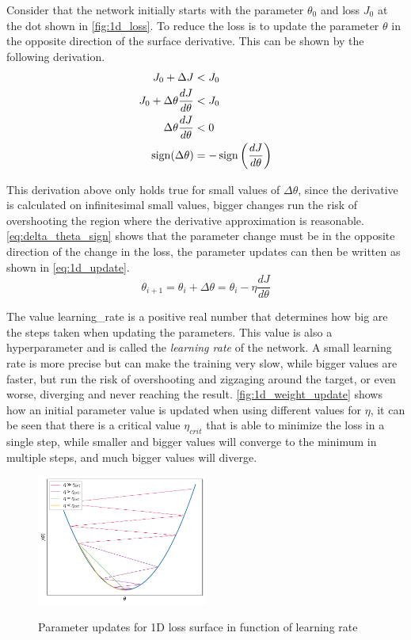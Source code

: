 Consider that the network initially starts with the parameter $\theta_0$ and loss $J_0$ at the dot shown in \autoref{fig:1d_loss}. To reduce the loss is to update the parameter $\theta$ in the opposite direction of the surface derivative. This can be shown by the following derivation.
\begin{align}
    J_0 + \Delta J & < J_0 \nonumber \\
    J_0 + \Delta\theta \frac{dJ}{d\theta} & < J_0 \nonumber \\
    \Delta\theta \frac{dJ}{d\theta} & < 0 \nonumber \\
    \operatorname{sign}(\Delta\theta) & = -\operatorname{sign}\left( \frac{dJ}{d\theta} \right) \label{eq:delta_theta_sign}
\end{align}

This derivation above only holds true for small values of $\Delta\theta$, since the derivative is calculated on infinitesimal small values, bigger changes run the risk of overshooting the region where the derivative approximation is reasonable.
\autoref{eq:delta_theta_sign} shows that the parameter change must be in the opposite direction of the change in the loss, the parameter updates can then be written as shown in \autoref{eq:1d_update}.
\begin{equation} \label{eq:1d_update}
    \theta_{i+1} = \theta_{i} + \Delta\theta = \theta_{i} - \eta \frac{dJ}{d\theta}
\end{equation}

The value \gls{learning_rate} is a positive real number that determines how big are the steps taken when updating the parameters. This value is also a hyperparameter and is called the \textit{learning rate} of the network. A small learning rate is more precise but can make the training very slow, while bigger values are faster, but run the risk of overshooting and zigzaging around the target, or even worse, diverging and never reaching the result. \autoref{fig:1d_weight_update} shows how an initial parameter value is updated when using different values for $\eta$, it can be seen that there is a critical value $\eta_{crit}$ that is able to minimize the loss in a single step, while smaller and bigger values will converge to the minimum in multiple steps, and much bigger values will diverge.
\begin{figure}
    \centering
    \caption{Parameter updates for 1D loss surface in function of learning rate}
    \includegraphics[width=0.5\textwidth]{chapters/NeuralNets/figures/1D-Weight-Update.pdf}
    \label{fig:1d_weight_update}
\end{figure}

